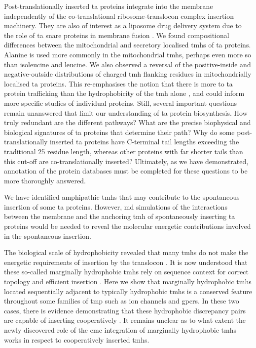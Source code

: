 Post\--translationally inserted \gls{ta} proteins integrate into the membrane independently of the co\--translational ribosome\--translocon complex insertion machinery.
They are also of interest as a liposome drug delivery system due to the role of \gls{ta} \gls{snare} proteins in membrane fusion \cite{Ungar2003, Allen2013, Nordlund2014}.
We found compositional differences between the mitochondrial and secretory localised \gls{tmh}s of \gls{ta} proteins.
Alanine is used more commonly in the mitochondrial \gls{tmh}s, perhaps even more so than isoleucine and leucine.
We also observed a reversal of the positive\--inside and negative\--outside distributions of charged \gls{tmh} flanking residues in mitochondrially localised \gls{ta} proteins.
This re\--emphasises the notion that there is more to \gls{ta} protein trafficking than the hydrophobicity of the \gls{tmh} alone \cite{Guna2018}, and could inform more specific studies of individual proteins.
Still, several important questions remain unanswered that limit our understanding of \gls{ta} protein biosynthesis.
How truly redundant are the different pathways?
What are the precise biophysical and biological signatures of \gls{ta} proteins that determine their path?
Why do some post-translationally inserted \gls{ta} proteins have C-terminal tail lengths exceeding the traditional 25 residue length, whereas other proteins with far shorter tails than this cut-off are co-translationally inserted?
Ultimately, as we have demonstrated, annotation of the protein databases must be completed for these questions to be more thoroughly answered.

We have identified amphipathic \gls{tmh}s that may contribute to the spontaneous insertion of some \gls{ta} proteins.
However, \gls{md} simulations of the interactions between the membrane and the anchoring \gls{tmh} of spontaneously inserting \gls{ta} proteins would be needed to reveal the molecular energetic contributions involved in the spontaneous insertion.

The biological scale of hydrophobicity revealed that many \gls{tmh}s do not make the energetic requirements of insertion by the translocon \cite{Hessa2007}.
It is now understood that these so\--called marginally hydrophobic \gls{tmh}s rely on sequence context for correct topology \cite{Ojemalm2012} and efficient insertion \cite{Hedin2010, Junne2017, Virkki2014}.
Here we show that marginally hydrophobic \gls{tmh}s located sequentially adjacent to typically hydrophobic \gls{tmh}s is a conserved feature throughout some families of \gls{tmp} such as ion channels and \gls{gpcr}s.
In these two cases, there is evidence demonstrating that these hydrophobic discrepancy pairs are capable of inserting cooperatively \cite{Ismail2008, Zhang2007, Sato2002, Sato2003, Cymer2015}.
It remains unclear as to what extent the newly discovered role of the \gls{emc} integration of marginally hydrophobic \gls{tmh}s \cite{Shurtleff2018} works in respect to cooperatively inserted \gls{tmh}s.

